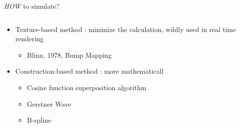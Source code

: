 \documentclass{beamer}
\begin{document}
\begin{frame}{\emph{HOW} to simulate?}
\begin{columns}[T]
\begin{column}
\begin{itemize}
        \item Texture-based method : minimize the calculation, wildly used in real time rendering
          \begin{itemize}
            [ball]  
            \item Blinn, 1978, Bump Mapping
          \end{itemize}
        \item Construction-based method : more mathematicall
          \begin{itemize}
            [ball]  
            \item Cosine function superposition algorithm
            \item Gerstner Wave
            \item B-spline
          \end{itemize}
      \end{itemize}
    \end{column}%
  \end{columns}
\end{frame}
\end{document}

